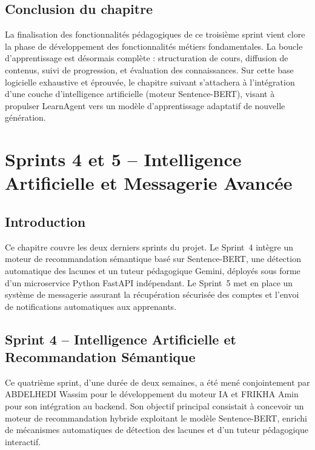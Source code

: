 \documentclass[12pt,a4paper]{report}
\begin{document}
\section*{Conclusion du chapitre}
La finalisation des fonctionnalités pédagogiques de ce troisième sprint vient clore la phase de développement des fonctionnalités métiers fondamentales. La boucle d'apprentissage est désormais complète : structuration de cours, diffusion de contenus, suivi de progression, et évaluation des connaissances. Sur cette base logicielle exhaustive et éprouvée, le chapitre suivant s'attachera à l'intégration d'une couche d'intelligence artificielle (moteur Sentence-BERT), visant à propulser LearnAgent vers un modèle d'apprentissage adaptatif de nouvelle génération.

\newpage


\chapter{Sprints 4 et 5 -- Intelligence Artificielle et Messagerie Avancée}

\section*{Introduction}

Ce chapitre couvre les deux derniers sprints du projet. Le Sprint~4 intègre un moteur de recommandation sémantique basé sur Sentence-BERT, une détection automatique des lacunes et un tuteur pédagogique Gemini, déployés sous forme d'un microservice Python FastAPI indépendant. Le Sprint~5 met en place un système de messagerie assurant la récupération sécurisée des comptes et l'envoi de notifications automatiques aux apprenants.


\section{Sprint 4 -- Intelligence Artificielle et Recommandation Sémantique}

Ce quatrième sprint, d'une durée de deux semaines, a été mené conjointement par ABDELHEDI Wassim pour le développement du moteur IA et FRIKHA Amin pour son intégration au backend. Son objectif principal consistait à concevoir un moteur de recommandation hybride exploitant le modèle Sentence-BERT, enrichi de mécanismes automatiques de détection des lacunes et d'un tuteur pédagogique interactif.
\end{document}

